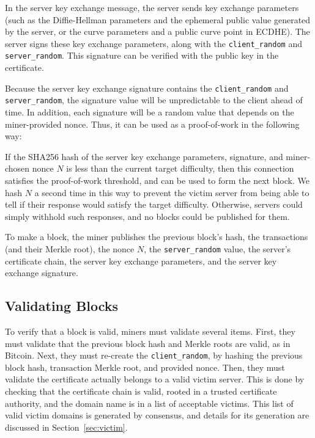 In the server key exchange message, the server sends key exchange parameters
(such as the Diffie-Hellman parameters and the ephemeral public value generated
by the server, or the curve parameters and a public curve point in ECDHE). The
server signs these key exchange parameters, along with the
\texttt{client\_random} and \texttt{server\_random}. This signature can be
verified with the public key in the certificate.

Because the server key exchange signature contains the \texttt{client\_random}
and \texttt{server\_random}, the signature value will be unpredictable to the
client ahead of time. In addition, each signature will be a random value that
depends on the miner-provided nonce. Thus, it can be used as a proof-of-work in the
following way:

If the SHA256 hash of the server key exchange parameters, signature, and
miner-chosen nonce $N$ is less than the current target difficulty, then this
connection satisfies the proof-of-work threshold, and can be used to form the
next block. We hash $N$ a second time in this way to prevent the victim server
from being able to tell if their response would satisfy the target difficulty.
Otherwise, servers could simply withhold such responses, and no blocks could be
published for them.

To make a block, the miner publishes the previous block's hash, the transactions
(and their Merkle root), the nonce $N$, the \texttt{server\_random} value, the
server's certificate chain, the server key exchange parameters, and the server
key exchange signature.

\subsection{Validating Blocks}

To verify that a block is valid, miners must validate several items. First, they
must validate that the previous block hash and Merkle roots are valid, as in
Bitcoin. Next, they must re-create the \texttt{client\_random}, by hashing the
previous block hash, transaction Merkle root, and provided nonce. Then, they
must validate the certificate actually belongs to a valid victim server. This is
done by checking that the certificate chain is valid, rooted in a trusted
certificate authority, and the domain name is in a list of acceptable victims.
This list of valid victim domains is generated by consensus, and details for its
generation are discussed in Section~\ref{sec:victim}.


